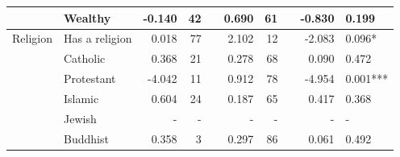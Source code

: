 \begin{table}[h!]
{\begin{threeparttable}
\begin{tabular}{llrrlrrlrl}
	& Wealthy                                                              & -0.140                       & 42                    &  & 0.690                        & 61                    &  & -0.830                                          & 0.199                                                                                               \\ \hline
	Religion                                                                           & Has a religion                                                       & 0.018                        & 77                    &  & 2.102                        & 12                    &  & -2.083                                          & 0.096*                                                                                              \\
	& Catholic                                                             & 0.368                        & 21                    &  & 0.278                        & 68                    &  & 0.090                                           & 0.472                                                                                               \\
	& Protestant                                                           & -4.042                       & 11                    &  & 0.912                        & 78                    &  & -4.954                                          & 0.001***                                                                                            \\
	& Islamic                                                              & 0.604                        & 24                    &  & 0.187                        & 65                    &  & 0.417                                           & 0.368                                                                                               \\
	& Jewish                                                               & -                            & -                     &  & -                            & -                     &  & -                                               & -                                                                                                   \\
	& Buddhist                                                             & 0.358                        & 3                     &  & 0.297                        & 86                    &  & 0.061                                           & 0.492                                                                                               \\

\end{tabular}
\end{threeparttable}}
\end{table}
